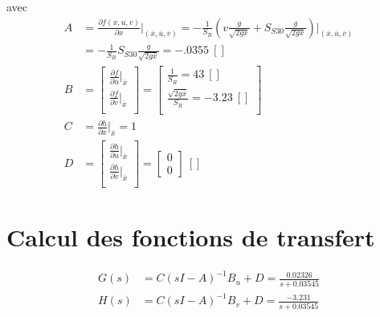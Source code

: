 \documentclass[frenchb, paper=a4, fontsize=11pt]{scrartcl}
\newcommand*\eq[1]{\overline{#1}} 				%
\numberwithin{equation}{section}					%
\numberwithin{figure}{section}					%
\numberwithin{table}{section}						%
\begin{document}
avec 
\begin{align}
A& = \frac{\partial f(x,u,v)}{\partial x}\rvert_{(\eq{x},\eq{u},\eq{v})} = -\frac{1}{S_R}(v\frac{g}{\sqrt{2gx}} + S_{S30}\frac{g}{\sqrt{2gx}})\rvert_{(\eq{x},\eq{u},\eq{v})} \\
&= -\frac{1}{S_R	} S_{S30} \frac{g}{\sqrt{2g\eq{x}}} = \SI{-.0355}{[]}\\
B &=\left[ \begin{array}{l}
 \frac{\partial f}{\partial u}\rvert_{\eq{x}} \\
  \frac{\partial f}{\partial v} \rvert_{\eq{x}}\\
\end{array} \right] 
= \left[ \begin{array}{l}
 \frac{1}{S_R} = \SI{43}{[]}\\
  \frac{\sqrt{2g\eq{x}}}{S_R}= \SI{-3.23}{[]}\\
\end{array} \right] \\
C &= \frac{\partial h}{\partial x}\rvert_{\eq{x}} = \SI{1}{}\\
D&=\left[ \begin{array}{l}
 \frac{\partial h}{\partial u}\rvert_{\eq{x}} \\
  \frac{\partial h}{\partial v} \rvert_{\eq{x}}\\
\end{array} \right]  = \left[ \begin{array}{l}
0\\
0
\end{array} \right] \SI{}{[]}
\end{align}

\section{Calcul des fonctions de transfert}
\begin{align}
G(s) &= C(sI-A)^{-1}B_u + D = \frac{0.02326}{s+0.03545}\\
H(s) &= C(sI-A)^{-1}B_v + D = \frac{-3.231}{s+0.03545}\\
\end{align}
\end{document}
